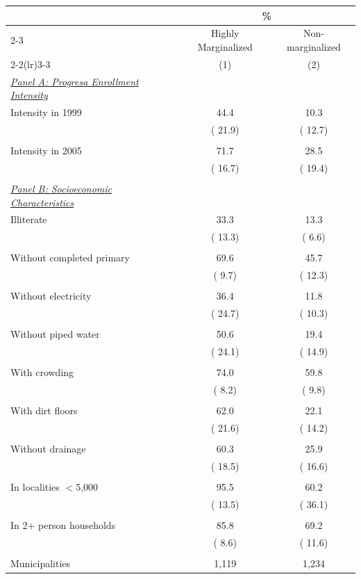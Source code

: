 \begin{tabular}{lcc} \hline \hline
& \multicolumn{2}{c}{\%} \\ 
\cmidrule(lr){2-3}
& \multicolumn{1}{c}{Highly Marginalized} & \multicolumn{1}{c}{Non-marginalized} \\ 
\cmidrule(lr){2-2}\cmidrule(lr){3-3}
& \multicolumn{1}{c}{(1)} & \multicolumn{1}{c}{(2)} \\ \toprule
\underline{\textit{Panel A: Progresa Enrollment Intensity}} \\ 
Intensity in 1999 &   44.4 &   10.3 \\ 
  & (  21.9) & (  12.7) \\ 
  & & \\ 
Intensity in 2005 &   71.7 &   28.5 \\ 
  & (  16.7) & (  19.4) \\ 
  & & \\ 
\underline{\textit{Panel B: Socioeconomic Characteristics}} \\ 
Illiterate &   33.3 &   13.3 \\ 
  & (  13.3) & (   6.6) \\ 
  & & \\ 
Without completed primary &   69.6 &   45.7 \\ 
  & (   9.7) & (  12.3) \\ 
  & & \\ 
Without electricity &   36.4 &   11.8 \\ 
  & (  24.7) & (  10.3) \\ 
  & & \\ 
Without piped water &   50.6 &   19.4 \\ 
  & (  24.1) & (  14.9) \\ 
  & & \\ 
With crowding &   74.0 &   59.8 \\ 
  & (   8.2) & (   9.8) \\ 
  & & \\ 
With dirt floors &   62.0 &   22.1 \\ 
  & (  21.6) & (  14.2) \\ 
  & & \\ 
Without drainage &   60.3 &   25.9 \\ 
  & (  18.5) & (  16.6) \\ 
  & & \\ 
In localities $<$5,000 &   95.5 &   60.2 \\ 
  & (  13.5) & (  36.1) \\ 
  & & \\ 
In 2+ person households &   85.8 &   69.2 \\ 
  & (   8.6) & (  11.6) \\ 
  & & \\ 
\midrule
Municipalities & 1,119 & 1,234 \\ 
\bottomrule
\end{tabular}
